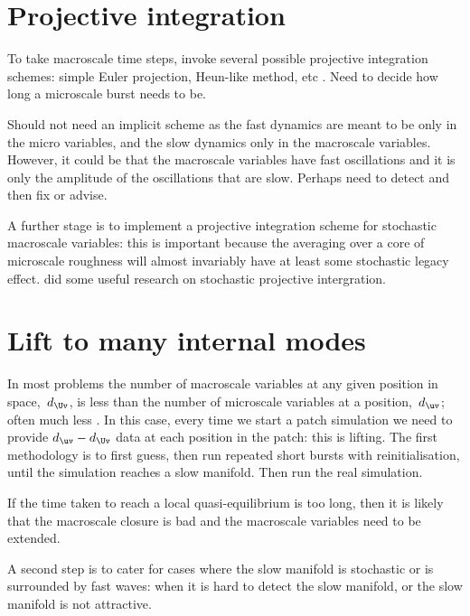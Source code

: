 \section{Projective integration}

To take macroscale time steps, invoke several possible projective integration schemes: simple Euler projection, Heun-like method, etc
\citep{Samaey08}.
Need to decide how long a microscale burst needs to be.

Should not need an implicit scheme as the fast dynamics are meant to be only in the micro variables, and the slow dynamics only in the macroscale variables.
However, it could be that the macroscale variables have fast oscillations and it is only the amplitude of the oscillations that are slow.  
Perhaps need to detect and then fix or advise.

A further stage is to implement a projective integration scheme for stochastic macroscale variables: this is important because the averaging over a core of microscale roughness will almost invariably have at least some stochastic legacy effect.
\cite{Calderon2007} did some useful research on stochastic projective intergration.




\section{Lift to many internal modes}

In most problems the number of macroscale variables at any given position in space,~\(d_{\Uv}\), is less than the number of microscale variables at a position,~\(d_{\uv}\); often much less \citep[e.g.]{Kevrekidis09a}.
In this case, every time we start a patch simulation we need to provide  \(d_{\uv}-d_{\Uv}\) data at each position in the patch: this is lifting.
The first methodology is to first guess, then run repeated short bursts with reinitialisation, until the simulation reaches a slow manifold.
Then run the real simulation.

If the time taken to reach a local quasi-equilibrium is too long, then it is likely that the macroscale closure is bad and the macroscale variables need to be extended.

A second step is to cater for cases where the slow manifold is stochastic or is surrounded by fast waves: when it is hard to detect the slow manifold, or the slow manifold is not attractive.





